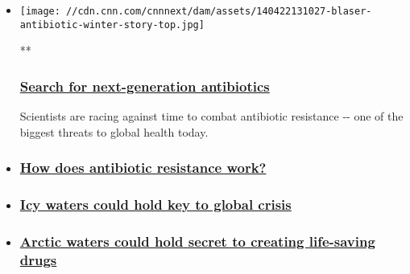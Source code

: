 \begin{itemize}
\item
  \href{/videos/international/2014/12/29/spc-vital-signs-extreme-antibiotics-a.cnn}{}

  \texttt{[image: //cdn.cnn.com/cnnnext/dam/assets/140422131027-blaser-antibiotic-winter-story-top.jpg]}

  **

  \hypertarget{search-for-next-generation-antibiotics}{%
  \subsubsection{\texorpdfstring{\href{/videos/international/2014/12/29/spc-vital-signs-extreme-antibiotics-a.cnn}{Search
  for next-generation
  antibiotics}}{Search for next-generation antibiotics}}\label{search-for-next-generation-antibiotics}}

  Scientists are racing against time to combat antibiotic resistance
  -\/- one of the biggest threats to global health today.
\item
  \hypertarget{how-does-antibiotic-resistance-work}{%
  \subsubsection{\texorpdfstring{\href{/videos/international/2014/12/29/spc-vital-signs-extreme-antibiotics-b.cnn}{How
  does antibiotic resistance
  work?}}{How does antibiotic resistance work?}}\label{how-does-antibiotic-resistance-work}}
\item
  \hypertarget{icy-waters-could-hold-key-to-global-crisis}{%
  \subsubsection{\texorpdfstring{\href{/videos/international/2014/12/29/spc-vital-signs-extreme-antibiotics-c.cnn}{Icy
  waters could hold key to global
  crisis}}{Icy waters could hold key to global crisis}}\label{icy-waters-could-hold-key-to-global-crisis}}
\item
  \hypertarget{arctic-waters-could-hold-secret-to-creating-life-saving-drugs}{%
  \subsubsection{\texorpdfstring{\href{/2015/01/15/health/antibiotic-arctic-bacteria-pharmasea/index.html}{Arctic
  waters could hold secret to creating life-saving
  drugs}}{Arctic waters could hold secret to creating life-saving drugs}}\label{arctic-waters-could-hold-secret-to-creating-life-saving-drugs}}
\end{itemize}

